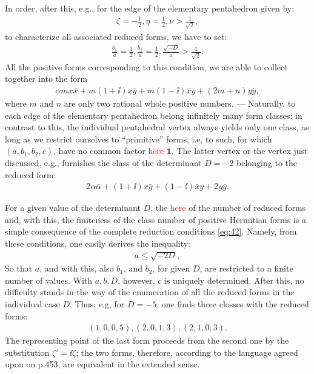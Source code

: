 In order, after this, e.g., for the edge of the elementary pentahedron given by:
\begin{align}
	\zeta=-\frac{1}{2}, \eta=\frac{1}{2}, \nu>\frac{1}{\sqrt{2}},
\end{align}
to characterize all associated reduced forms, we have to set:
\begin{align}
	\frac{b_1}{a}=\frac{1}{2}, \frac{b_2}{a}=\frac{1}{2}, \frac{\sqrt{-D}}{a}>\frac{1}{\sqrt{2}}.
\end{align}
All the positive forms corresponding to this condition, we are able to collect together into the form
\begin{align}
	\alpha m x \bar{x}+m(1+\ii)x\bar{y}+m(1-\ii)\bar{x}y+(2m+n)y\bar{y},
\end{align}
where $m$ and $n$ are only two rational whole positive numbers. --- Naturally, to each edge of the elementary pentahedron belong infinitely many form classes; in contrast to this, the individual pentahedral vertex always yields only one class, as long as we restrict ourselves to “primitive” forms, i.e, to such, for which $(a,b_1,b_2,c)$, have no common factor \textcolor{red}{here} $\mathbf{1}$. The latter vertex or the vertex just discussed, e.g., furnishes the class of the determinant $D=-2$ belonging to the reduced form:
\begin{align}
	2\alpha\bar{\alpha}+(1+\ii)x\bar{y}+(1-\ii)\bar{x}y+2y\bar{y}.
\end{align}

For a given value of the determinant $D$, the \textcolor{red}{here} of the number of reduced forms and, with this, the finiteness of the class number of positive Hermitian forms is a simple consequence of the complete reduction conditions \ref{eq:42}. Namely, from these conditions, one easily derives the inequality:
\begin{align}
	a\leq \sqrt{-2D},
\end{align}
So that $a$, and with this, also $b_1$, and $b_2$, for given $D$, are restricted to a finite number of values. With $a, b, D$, however, $c$ is uniquely determined, After this, no difficulty stands in the way of the enumeration of all the reduced forms in the individual case $D$. Thus, e.g, for $D=-5$, one finds three closses with the reduced forms:
\begin{align}
	(1,0,0,5),(2,0,1,3),(2,1,0,3).
\end{align}
The representing point of the last form proceeds from the second one by the substitution $\zeta'=\ii \zeta$; the two forms, therefore, according to the language agreed upon on p.453, are equivalent in the extended sense.

